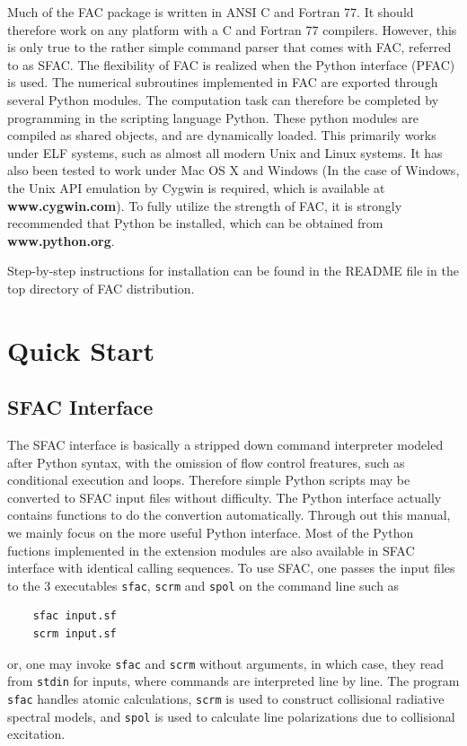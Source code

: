 \documentclass[twoside,letterpaper]{refrep}
\begin{document}
Much of the FAC package is written in ANSI C and Fortran 77. It should 
therefore work on any platform with a C and Fortran 77 compilers. However, 
this is only true to the rather simple command parser that comes with FAC, referred 
to as SFAC. The flexibility of FAC is realized when the Python interface
(PFAC) is used. The numerical subroutines implemented in FAC are exported
through several Python modules. The computation task can therefore be
completed by programming in the scripting language Python. These python
modules are compiled as shared objects, and are dynamically loaded. This
primarily works under ELF systems, such as almost all modern Unix and Linux
systems. It has also been tested to work under Mac OS X and Windows (In the
case of Windows, the Unix API emulation by Cygwin is required, which is
available at \textbf{www.cygwin.com}). To fully utilize the strength of  
FAC, it is strongly recommended that Python be installed, which can be obtained
from \textbf{www.python.org}.

Step-by-step instructions for installation can be found in the README file in
the top directory of FAC distribution.

\section{Quick Start}
\label{sec:start}
\subsection{SFAC Interface}
The SFAC interface is basically a stripped down command interpreter modeled
after Python syntax, with the omission of flow control freatures, such as
conditional execution and loops. Therefore simple Python scripts may be
converted to SFAC input files without difficulty. The Python interface
actually contains functions to do the convertion automatically. Through out
this manual, we mainly focus on the more useful Python interface. Most of the
Python fuctions implemented in the extension modules are also available in
SFAC interface with identical calling sequences. To use SFAC, one passes the
input files to the 3 executables \verb|sfac|, \verb|scrm| and \verb|spol| on
the command line such as 
\begin{verbatim}
    sfac input.sf
    scrm input.sf
\end{verbatim}
or, one may invoke \verb|sfac| and \verb|scrm| without arguments, in which
case, they read from \verb|stdin| for inputs, where commands are interpreted
line by line. The program \verb|sfac| handles atomic calculations,
\verb|scrm| is used to construct collisional radiative spectral models, and 
\verb|spol| is used to calculate line polarizations due to collisional
excitation. 
\end{document}
